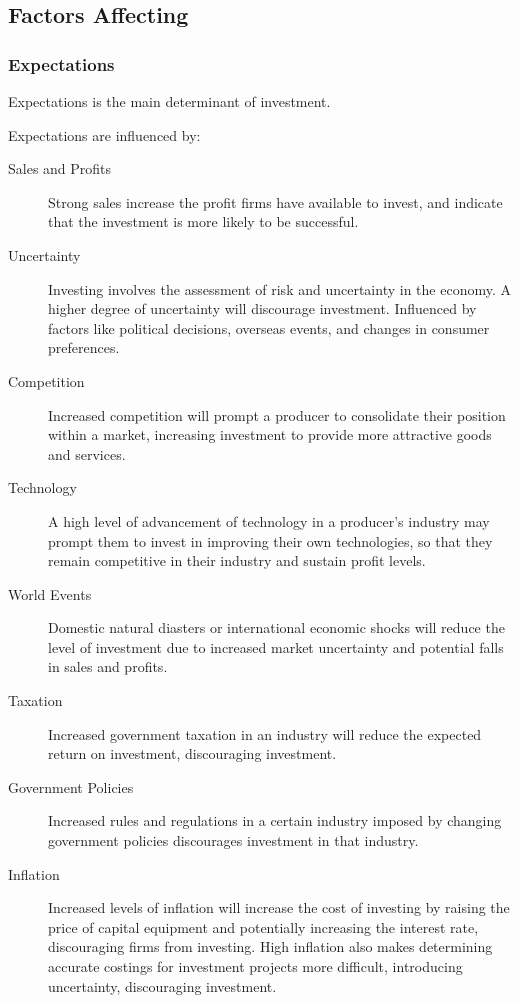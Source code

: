 \documentclass[a4paper,11pt]{article}
\begin{document}
\subsection{Factors Affecting}

\subsubsection{Expectations}

Expectations is the main determinant of investment.

Expectations are influenced by:

\begin{description}
\item [Sales and Profits] Strong sales increase the profit firms have available
	to invest, and indicate that the investment is more likely to be successful.
\item [Uncertainty] Investing involves the assessment of risk and uncertainty
	in the economy. A higher degree of uncertainty will discourage investment.
	Influenced by factors like political decisions, overseas events, and
	changes in consumer preferences.
\item [Competition] Increased competition will prompt a producer to consolidate
	their position within a market, increasing investment to provide more
	attractive goods and services.
\item [Technology] A high level of advancement of technology in a producer's
	industry may prompt them to invest in improving their own technologies, so
	that they remain competitive in their industry and sustain profit levels.
\item [World Events] Domestic natural diasters or international economic shocks
	will reduce the level of investment due to increased market uncertainty
	and potential falls in sales and profits.
\item [Taxation] Increased government taxation in an industry will reduce the
	expected return on investment, discouraging investment.
\item [Government Policies] Increased rules and regulations in a certain
	industry imposed by changing government policies discourages investment in
	that industry.
\item [Inflation] Increased levels of inflation will increase the cost of
	investing by raising the price of capital equipment and potentially
	increasing the interest rate, discouraging firms from investing. High
	inflation also makes determining accurate costings for investment projects
	more difficult, introducing uncertainty, discouraging investment.
\end{description}
\end{document}
